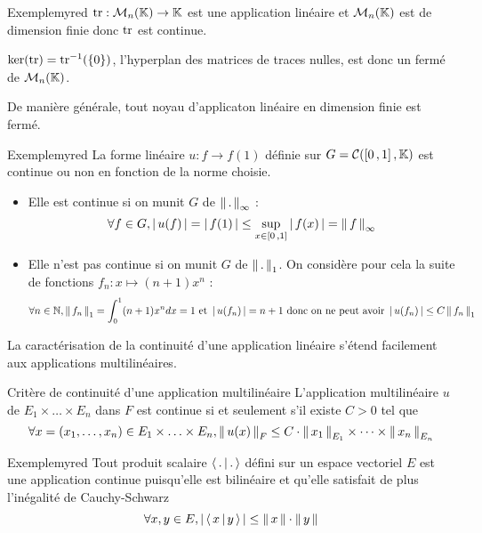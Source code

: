     \begin{omed}{Exemple}{myred}
        $\operatorname{tr} : \mathcal{M}_{n}(\mathbb{K}) \rightarrow \mathbb{K}$ est une application linéaire et $\mathcal{M}_{n}(\mathbb{K})$ est de dimension finie donc $\operatorname{tr}$ est continue.

        $\ker(\operatorname{tr}) = \operatorname{tr}^{-1}(\{ 0 \})$, l’hyperplan des matrices de traces nulles, est donc un fermé de $\mathcal{M}_{n}(\mathbb{K})$.
    \end{omed}

    De manière générale, tout noyau d’applicaton linéaire en dimension finie est fermé.

    \begin{omed}{Exemple}{myred}
        La forme linéaire $u : f \rightarrow f(1)$ définie sur $G = \mathcal{C}(\left[ 0 \, , 1 \right], \mathbb{K})$ est continue ou non en fonction de la norme choisie.
        \begin{itemize}
            \item Elle est continue si on munit $G$ de $\left\lVert \,. \, \right\rVert_{\infty}$ :
            \[ \forall f \in G, \left\lvert \,u(f) \, \right\rvert = \left\lvert \,f(1) \, \right\rvert \leq \sup_{x \in \left[ 0 \, , 1 \right]} \left\lvert \,f(x) \, \right\rvert = \left\lVert \,f \, \right\rVert_{\infty} \] 
            \item Elle n’est pas continue si on munit $G$ de $\left\lVert \,. \, \right\rVert_1$. On considère pour cela la suite de fonctions $f_n : x \mapsto (n+1)x^n$ : 
            \[ \forall n \in \mathbb{N}, \left\lVert \,f_n \, \right\rVert_1 = \int_{0}^{1} (n+1)x^n dx = 1 \text{ et } \left\lvert \,u(f_n) \, \right\rvert = n+1 \text{ donc on ne peut avoir } \left\lvert \,u(f_n) \, \right\rvert \leq C \left\lVert \,f_n \, \right\rVert_1 \]
        \end{itemize}
    \end{omed}

    La caractérisation de la continuité d’une application linéaire s’étend facilement aux applications multilinéaires.

    \begin{theo}{Critère de continuité d’une application multilinéaire}{}
        L’application multilinéaire $u$ de $E_1 \times \ldots \times E_n$ dans $F$ est continue si et seulement s’il existe $C > 0$ tel que 
        \[ \forall x = (x_1, \ldots, x_n) \in E_1 \times \ldots \times E_n, \left\lVert \,u(x) \, \right\rVert_F \leq C \cdot \left\lVert \,x_1 \, \right\rVert_{E_1} \times \cdots \times \left\lVert \,x_n \, \right\rVert_{E_n} \]
    \end{theo}

    \begin{omed}{Exemple}{myred}
        Tout produit scalaire $\left<\,.\,\middle|\,.\,\right>$ défini sur un espace vectoriel $E$ est une application continue puisqu’elle est bilinéaire et qu’elle satisfait de plus l’inégalité de Cauchy-Schwarz 
        \[ \forall x,y \in E, \left\lvert \,\left<\,x\,\middle|\,y\,\right> \, \right\rvert \leq \left\lVert \,x \, \right\rVert \cdot \left\lVert \,y \, \right\rVert \] 
    \end{omed}


